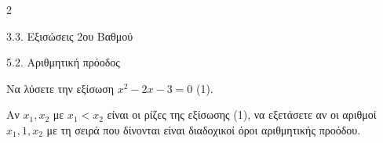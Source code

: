 \begin{ylh}{2}
    \item 3.3. Εξισώσεις 2ου Βαθμού
    \item 5.2. Αριθμητική πρόοδος
\end{ylh}

\begin{alist}
\item Να λύσετε την εξίσωση $x^2 - 2x - 3 = 0$ (1).
\item Αν $x_1, x_2$ με $x_1 < x_2$ είναι οι ρίζες της εξίσωσης (1), να εξετάσετε αν οι αριθμοί $x_1, 1, x_2$ με τη σειρά που δίνονται είναι διαδοχικοί όροι αριθμητικής προόδου.
\end{alist}

